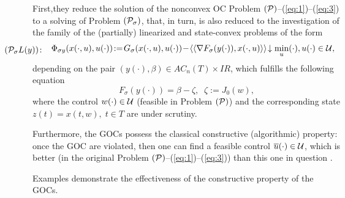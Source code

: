 \documentclass[12pt]{llncs}
\begin{document}
First,they reduce the solution of the nonconvex OC Problem $({\cal P})$--(\ref{eq:1})--(\ref{eq:3}) to a solving  of Problem $({\cal P}_\sigma)$, that, in turn, is also reduced to the investigation of the family of the (partially)
linearized and state-convex problems of the form \cite{24Strek2013,25Strek2021,26Strek2019}
\begin{equation}%
\lefteqn{\hspace{-1.2cm}
	({\cal P}_\sigma L (y))\colon}
	\left.
	\begin{array}{c}
		\quad\;\Phi_{\sigma y} (x(\cdot,u),u(\cdot))\!:=\!G_\sigma(x(\cdot,u),u(\cdot))\!-\!\langle \langle \nabla F_\sigma (y(\cdot)), x(\cdot,u) \rangle \rangle\!\downarrow \min\limits_u(\cdot),  u(\cdot) \in {\cal U},
	\end{array}\right.%
\end{equation}
depending on the pair $(y(\cdot),\beta)\in AC_n(T)\times I\!\! R$, which fulfills the following equation
$$%
	F_\sigma (y(\cdot))=\beta-\zeta,\;\;\zeta:=J_0(w),
$$%
where the control $w(\cdot)\in {\cal U}$ (feasible in Problem $({\cal P})$) and the corresponding state\linebreak  $z(t)=x(t,w),\;t\in T$ are under scrutiny.


Furthermore, the GOCs possess the classical constructive (algorithmic) property: once the GOC are violated, then one can find a feasible control $\overline{u}(\cdot)\in {\cal U}$, which is better (in the original  Problem $({\cal P})$--(\ref{eq:1})--(\ref{eq:3})) than this one in question \cite{24Strek2013,25Strek2021,26Strek2019}.

Examples demonstrate  the effectiveness of the constructive property of the GOCs.






\end{document}
